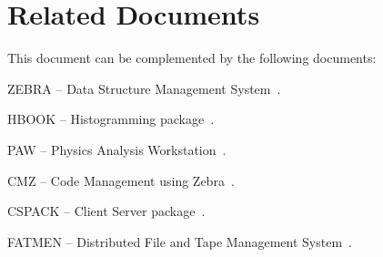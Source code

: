 \section*{Related Documents}

This document can be complemented by the following documents:
\begin{UL}
\item ZEBRA -- Data Structure Management System~\cite{bib-ZEBRA}.
\item HBOOK -- Histogramming package~\cite{bib-HBOOK}.
\item PAW -- Physics Analysis Workstation~\cite{bib-PAW}.
\item CMZ -- Code Management using Zebra~\cite{bib-CMZ}.
\item CSPACK -- Client Server package~\cite{bib-CSPACK}.
\item FATMEN -- Distributed File and Tape Management System~\cite{bib-FATMEN}.
\end{UL}

\cleardoublepage

\tableofcontents
